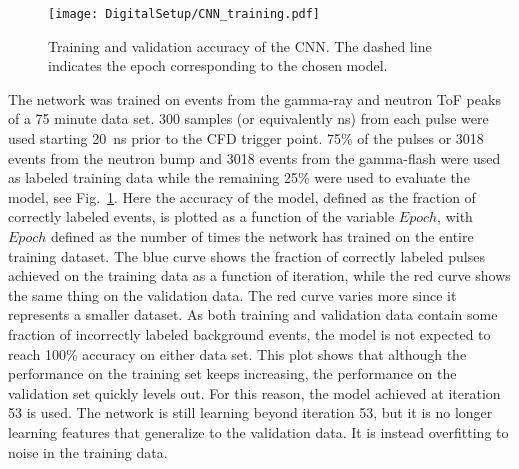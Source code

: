 \documentclass[main.tex]{subfiles}
\begin{document}
\begin{figure}[ht!]
    \centering
        \texttt{[image: DigitalSetup/CNN\_training.pdf]}
        \caption[Training and validation accuracy of the CNN.]{Training and validation accuracy of the CNN. The dashed line indicates the epoch corresponding to the chosen model.}
    \label{fig:CNN_training} 
\end{figure}

The network was trained on events from the gamma-ray and neutron ToF peaks of a 75 minute data set. 300 samples (or equivalently ns) from each pulse were used starting \SI{20}{ns} prior to the CFD trigger point. 75\% of the pulses or 3018 events from the neutron bump and 3018 events from the gamma-flash were used as labeled training data while the remaining 25\% were used to evaluate the model, see Fig.~\ref{fig:CNN_training}. Here the accuracy of the model, defined as the fraction of correctly labeled events, is plotted as a function of the variable $Epoch$, with $Epoch$ defined as the number of times the network has trained on the entire training dataset. The blue curve shows the fraction of correctly labeled pulses achieved on the training data as a function of iteration, while the red curve shows the same thing on the validation data. The red curve varies more since it represents a smaller dataset. As both training and validation data contain some fraction of incorrectly labeled background events, the model is not expected to reach 100\% accuracy on either data set. This plot shows that although the performance on the training set keeps increasing, the performance on the validation set quickly levels out. For this reason, the model achieved at iteration 53 is used. The network is still learning beyond iteration 53, but it is no longer learning features that generalize to the validation data. It is instead overfitting to noise in the training data.
\end{document}
